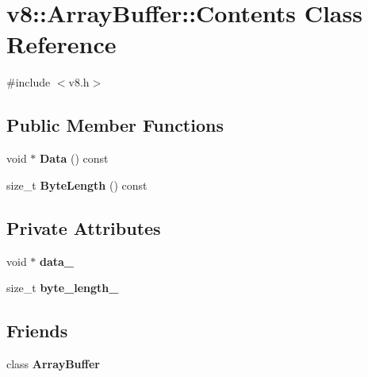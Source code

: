 \hypertarget{classv8_1_1_array_buffer_1_1_contents}{}\section{v8\+:\+:Array\+Buffer\+:\+:Contents Class Reference}
\label{classv8_1_1_array_buffer_1_1_contents}


{\ttfamily \#include $<$v8.\+h$>$}

\subsection*{Public Member Functions}
\begin{DoxyCompactItemize}
\item 
void $\ast$ {\bfseries Data} () const \hypertarget{classv8_1_1_array_buffer_1_1_contents_a9ed7556bfaca7a0b24deb05538a76dcd}{}\label{classv8_1_1_array_buffer_1_1_contents_a9ed7556bfaca7a0b24deb05538a76dcd}

\item 
size\+\_\+t {\bfseries Byte\+Length} () const \hypertarget{classv8_1_1_array_buffer_1_1_contents_a1b6a3eecb4fe05f4d33c83b6bc1fa737}{}\label{classv8_1_1_array_buffer_1_1_contents_a1b6a3eecb4fe05f4d33c83b6bc1fa737}

\end{DoxyCompactItemize}
\subsection*{Private Attributes}
\begin{DoxyCompactItemize}
\item 
void $\ast$ {\bfseries data\+\_\+}\hypertarget{classv8_1_1_array_buffer_1_1_contents_adc9777b758068477dd848b7c090ec96d}{}\label{classv8_1_1_array_buffer_1_1_contents_adc9777b758068477dd848b7c090ec96d}

\item 
size\+\_\+t {\bfseries byte\+\_\+length\+\_\+}\hypertarget{classv8_1_1_array_buffer_1_1_contents_afc6781b4a3443c04ea2b17c9c0e9e852}{}\label{classv8_1_1_array_buffer_1_1_contents_afc6781b4a3443c04ea2b17c9c0e9e852}

\end{DoxyCompactItemize}
\subsection*{Friends}
\begin{DoxyCompactItemize}
\item 
class {\bfseries Array\+Buffer}\hypertarget{classv8_1_1_array_buffer_1_1_contents_acbcb25033a90500a51aa19c811b2a1d3}{}\label{classv8_1_1_array_buffer_1_1_contents_acbcb25033a90500a51aa19c811b2a1d3}

\end{DoxyCompactItemize}


